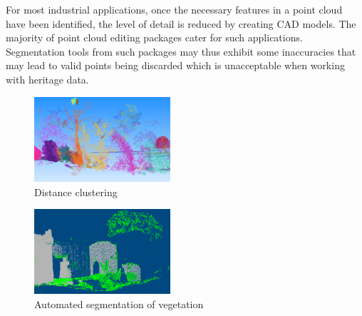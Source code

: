 \documentclass[10pt,twocolumn]{article}
\begin{document}
For most industrial applications, once the necessary features in a point cloud have been identified, the level of detail is reduced by creating CAD models. The majority of point cloud editing packages cater for such applications. Segmentation tools from such packages may thus exhibit some inaccuracies that may lead to valid points being discarded which is unacceptable when working with heritage data.


\begin{figure}[htb]
\centering
\includegraphics[width=0.45\textwidth]{3dreshaper.png}
\caption{Distance clustering \cite{Technodigit2012}}
\label{fig:dist}
\end{figure}

\begin{figure}[htb]
\centering
\includegraphics[width=0.45\textwidth]{vrmesh.png}
\caption{Automated segmentation of vegetation \cite{VirtualGrid2012}}
\label{fig:trees}
\end{figure}
\end{document}
